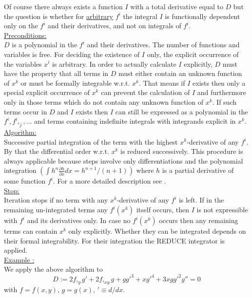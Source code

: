 Of course there
always exists a function $I$ with a total derivative equal to $D$ but
the question is whether for \underline{arbitrary} $f^i$ the integral
$I$ is functionally dependent only on the $f^i$ and their derivatives,
and not on integrals of $f^i.$ \\
\underline{Preconditions:} \\
$D$ is a polynomial in the $f^i$ and their derivatives. The number of
functions and variables is free. 
For deciding the existence of $I$ only, the explicit occurrence of the
variables $x^i$ is arbitrary. In order to actually
calculate $I$ explicitly, $D$ must have the property that all terms in $D$ 
must either contain an unknown function of $x^k$ or
must be formally integrable w.r.t. $x^k.$
That means if $I$ exists then 
only a special explicit occurrence of $x^k$ can prevent the
calculation of $I$ 
and furthermore only in those terms which do not contain
any unknown function of $x^k.$ 
If such terms occur in $D$ and $I$ exists then $I$ can still be expressed
as a polynomial in the $f^i, f^i,_j, \ldots$ and terms containing 
indefinite integrals with integrands explicit in $x^k.$ \\
\underline{Algorithm:} \\
Successive partial integration of the term with the highest
$x^k$-derivative of any $f^i.$ By that the 
differential order w.r.t. $x^k$ is reduced
successively. This procedure is always applicable because steps involve only
differentiations and the polynomial
integration $(\int h^n\frac{\partial h}{\partial x}dx =
h^{n+1}/(n+1))$ where $h$ is a partial derivative of some function
$f^i.$ For a more detailed description see \cite{WoInt}.\\
\underline{Stop:} \\
Iteration stops if no term with any $x^k$-derivative of any $f^i$ is left.
If in the remaining un-integrated terms any $f^i(x^k)$ itself occurs,
then $I$ is not expressible with $f^i$ and its derivatives only.  In
case no $f^i(x^k)$ occurs then any remaining terms can contain $x^k$ only
explicitly. Whether they can be integrated depends on their formal
integrability. For their integration the REDUCE integrator is applied. \\
\underline{Example :} \\
We apply the above algorithm to
\begin{equation}
D := 2f,_yg' + 2f,_{xy}g + gg'^3 + xg'^4 + 3xgg'^2g'' = 0
\label{D}
\end{equation}
with $f = f(x,y), \, g = g(x), \, '\equiv d/dx.$

